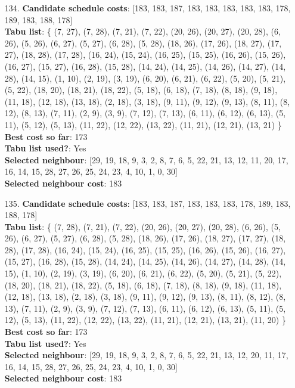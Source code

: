 \documentclass[fleqn]{article}
\begin{document}
\begin{itemize}
    \item[134.] \textbf{Candidate schedule costs}: [183, 183, 187, 183, 183, 183, 183, 183, 178, 189, 183, 188, 178] \\
    \textbf{Tabu list}: \{ (7, 27), (7, 28), (7, 21), (7, 22), (20, 26), (20, 27), (20, 28), (6, 26), (5, 26), (6, 27), (5, 27), (6, 28), (5, 28), (18, 26), (17, 26), (18, 27), (17, 27), (18, 28), (17, 28), (16, 24), (15, 24), (16, 25), (15, 25), (16, 26), (15, 26), (16, 27), (15, 27), (16, 28), (15, 28), (14, 24), (14, 25), (14, 26), (14, 27), (14, 28), (14, 15), (1, 10), (2, 19), (3, 19), (6, 20), (6, 21), (6, 22), (5, 20), (5, 21), (5, 22), (18, 20), (18, 21), (18, 22), (5, 18), (6, 18), (7, 18), (8, 18), (9, 18), (11, 18), (12, 18), (13, 18), (2, 18), (3, 18), (9, 11), (9, 12), (9, 13), (8, 11), (8, 12), (8, 13), (7, 11), (2, 9), (3, 9), (7, 12), (7, 13), (6, 11), (6, 12), (6, 13), (5, 11), (5, 12), (5, 13), (11, 22), (12, 22), (13, 22), (11, 21), (12, 21), (13, 21) \} \\
    \textbf{Best cost so far}: 173 \\
    \textbf{Tabu list used?}: Yes \\
    \textbf{Selected neighbour}: [29, 19, 18, 9, 3, 2, 8, 7, 6, 5, 22, 21, 13, 12, 11, 20, 17, 16, 14, 15, 28, 27, 26, 25, 24, 23, 4, 10, 1, 0, 30] \\
    \textbf{Selected neighbour cost}: 183
      

    \item[135.] \textbf{Candidate schedule costs}: [183, 183, 187, 183, 183, 183, 178, 189, 183, 188, 178] \\
    \textbf{Tabu list}: \{ (7, 28), (7, 21), (7, 22), (20, 26), (20, 27), (20, 28), (6, 26), (5, 26), (6, 27), (5, 27), (6, 28), (5, 28), (18, 26), (17, 26), (18, 27), (17, 27), (18, 28), (17, 28), (16, 24), (15, 24), (16, 25), (15, 25), (16, 26), (15, 26), (16, 27), (15, 27), (16, 28), (15, 28), (14, 24), (14, 25), (14, 26), (14, 27), (14, 28), (14, 15), (1, 10), (2, 19), (3, 19), (6, 20), (6, 21), (6, 22), (5, 20), (5, 21), (5, 22), (18, 20), (18, 21), (18, 22), (5, 18), (6, 18), (7, 18), (8, 18), (9, 18), (11, 18), (12, 18), (13, 18), (2, 18), (3, 18), (9, 11), (9, 12), (9, 13), (8, 11), (8, 12), (8, 13), (7, 11), (2, 9), (3, 9), (7, 12), (7, 13), (6, 11), (6, 12), (6, 13), (5, 11), (5, 12), (5, 13), (11, 22), (12, 22), (13, 22), (11, 21), (12, 21), (13, 21), (11, 20) \} \\
    \textbf{Best cost so far}: 173 \\
    \textbf{Tabu list used?}: Yes \\
    \textbf{Selected neighbour}: [29, 19, 18, 9, 3, 2, 8, 7, 6, 5, 22, 21, 13, 12, 20, 11, 17, 16, 14, 15, 28, 27, 26, 25, 24, 23, 4, 10, 1, 0, 30] \\
    \textbf{Selected neighbour cost}: 183
      


\end{itemize}
\end{document}
